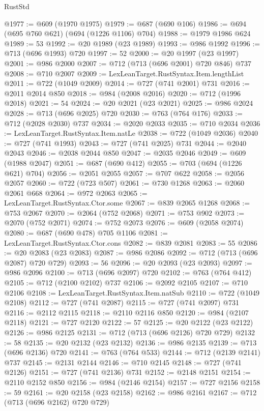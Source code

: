 \begin{lexlean}{RustStd}
\begin{coremodule}
@1977 := @609 (@1970 @1975)
@1979 := @687 (@690 @106)
@1986 := @694 (@695 @760 @621) (@694 (@1226 @1106) @704)
@1988 := @1979 @1986 @624
@1989 := 53
@1992 := @20 @1989 (@23 @1989)
@1993 := @986 @1992
@1996 := @713 (@696 @1993) @720
@1997 := 52
@2000 := @20 @1997 (@23 @1997)
@2001 := @986 @2000
@2007 := @712 (@713 (@696 @2001) @720 @846) @737
@2008 := @710 @2007
@2009 := LexLeanTarget.RustSyntax.Item.lengthList
@2011 := @722 (@1049 @2009)
@2014 := @727 (@741 @2001) @731
@2016 := @2011 @2014 @850
@2018 := @984 (@2008 @2016)
@2020 := @712 (@1996 @2018)
@2021 := 54
@2024 := @20 @2021 (@23 @2021)
@2025 := @986 @2024
@2028 := @713 (@696 @2025) @720
@2030 := @763 (@764 @176)
@2033 := @712 (@2028 @2030) @737
@2034 := @2020 @2033
@2035 := @710 @2034
@2036 := LexLeanTarget.RustSyntax.Item.natLe
@2038 := @722 (@1049 @2036)
@2040 := @727 (@741 @1993)
@2043 := @727 (@741 @2025) @731
@2044 := @2040 @2043
@2046 := @2038 @2044 @850
@2047 := @2035 @2046
@2049 := @609 (@1988 @2047)
@2051 := @687 (@690 @412)
@2055 := @703 (@694 (@1226 @621) @704)
@2056 := @2051 @2055
@2057 := @707 @622
@2058 := @2056 @2057
@2060 := @722 (@723 @507)
@2061 := @730 @1268
@2063 := @2060 @2061 @668
@2064 := @972 @2063
@2065 := LexLeanTarget.RustSyntax.Ctor.some
@2067 := @839 @2065 @1268
@2068 := @753 @2067
@2070 := @2064 (@752 @2068)
@2071 := @753 @902
@2073 := @2070 (@752 @2071)
@2074 := @752 @2073
@2076 := @609 (@2058 @2074)
@2080 := @687 (@690 @478) @705 @1106
@2081 := LexLeanTarget.RustSyntax.Ctor.cons
@2082 := @839 @2081
@2083 := 55
@2086 := @20 @2083 (@23 @2083)
@2087 := @986 @2086
@2092 := @712 (@713 (@696 @2087) @720 @729)
@2093 := 56
@2096 := @20 @2093 (@23 @2093)
@2097 := @986 @2096
@2100 := @713 (@696 @2097) @720
@2102 := @763 (@764 @412)
@2105 := @712 (@2100 @2102) @737
@2106 := @2092 @2105
@2107 := @710 @2106
@2108 := LexLeanTarget.RustSyntax.Item.natSub
@2110 := @722 (@1049 @2108)
@2112 := @727 (@741 @2087)
@2115 := @727 (@741 @2097) @731
@2116 := @2112 @2115
@2118 := @2110 @2116 @850
@2120 := @984 (@2107 @2118)
@2121 := @727 @2120
@2122 := 57
@2125 := @20 @2122 (@23 @2122)
@2126 := @986 @2125
@2131 := @712 (@713 (@696 @2126) @720 @729)
@2132 := 58
@2135 := @20 @2132 (@23 @2132)
@2136 := @986 @2135
@2139 := @713 (@696 @2136) @720
@2141 := @763 (@764 @533)
@2144 := @712 (@2139 @2141) @737
@2145 := @2131 @2144
@2146 := @710 @2145
@2148 := @727 (@741 @2126)
@2151 := @727 (@741 @2136) @731
@2152 := @2148 @2151
@2154 := @2110 @2152 @850
@2156 := @984 (@2146 @2154)
@2157 := @727 @2156
@2158 := 59
@2161 := @20 @2158 (@23 @2158)
@2162 := @986 @2161
@2167 := @712 (@713 (@696 @2162) @720 @729)

\end{coremodule}
\end{lexlean}
